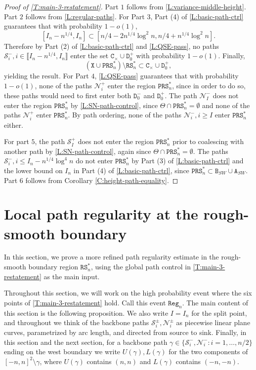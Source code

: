 \documentclass[11pt,twoside]{amsart}
\theoremstyle{plain}
\numberwithin{quest}{section}
\theoremstyle{remark}
\numberwithin{rem}{section}
\theoremstyle{definition}
\newcommand{\cS}{\mathcal{S}}
\newcommand{\cN}{\mathcal{N}}
\newcommand{\II}[1]{\llbracket #1 \rrbracket}
\renewcommand{\tt}[1]{{\mathtt{#1}}}
\begin{document}
	\begin{proof}[Proof of \cref{T:main-3-restatement}]
	Part $1$ follows from \cref{L:variance-middle-height}.	Part $2$ follows from \cref{L:regular-paths}. For Part $3$, Part (4) of \cref{L:basic-path-ctrl} guarantees that with probability $1 - o(1)$,
	 $$
	 [I_n - n^{1/4}, I_n] \subset [n/4 - 2 n^{1/4} \log^2 n, n/4 + n^{1/4} \log^2 n].
	 $$ 
	 Therefore by Part (2) of \cref{L:basic-path-ctrl} and \cref{L:QSE-pass}, no paths $\cS_i^-, i \in \II{I_n - n^{1/4}, I_n}$ enter the set $\tt{C}_\times \cup \tt{D}_0^+$ with probability $1 - o(1)$. Finally,
	 $$
	 (\tt{X} \cup \tt{PRS}^*_n) \setminus \tt{RS}^*_n \subset \tt{C}_\times \cup \tt{D}_0^+,
	 $$ 
	yielding the result. For Part $4$, \cref{L:QSE-pass} guarantees that with probability $1 - o(1)$, none of the paths $\cN_i^+$ enter the region $\tt{PRS}^*_n$, since in order to do so, these paths would need to first enter both $\tt{D}_0^-$ and $\tt{D}_0^+$. The path $\cN_I^-$ does not enter the region $\tt{PRS}^*_n$ by \cref{L:SN-path-control}, since $\Theta \cap \tt{PRS}^*_n = \emptyset$ and none of the paths $\cN_i^+$ enter $\tt{PRS}^*_n$. By path ordering, none of the paths $\cN_i^-, i \ge I$ enter $\tt{PRS}^*_n$ either.
	
	For part $5$, the path $\cS_I^+$ does not enter the region $\tt{PRS}^*_n$ prior to coalescing with another path by \cref{L:SN-path-control}, again since $\Theta \cap \tt{PRS}^*_n = \emptyset$.  The paths $\cS_i^-, i \le I_n - n^{1/4} \log^4 n$ do not enter $\tt{PRS}^*_n$ by Part (3) of \cref{L:basic-path-ctrl} and the lower bound on $I_n$ in Part (4) of \cref{L:basic-path-ctrl}, since $\tt{PRS}^*_n \subset \tt{B}_{SW} \cup \tt{A}_{SW}$. Part $6$ follows from Corollary \ref{C:height-path-equality}.
	\end{proof}
	
	\section{Local path regularity at the rough-smooth boundary}
	\label{S:regularity}
	In this section, we prove a more refined path regularity estimate in the rough-smooth boundary region $\tt{RS}_n^*$,  using the global path control in \cref{T:main-3-restatement} as the main input. 
	
	Throughout this section, we will work on the high probability event where the six points of \cref{T:main-3-restatement} hold. Call this event $\tt{Reg}_n$. The main content of this section is the following proposition. We also write $I = I_n$ for the split point, and throughout we think of the backbone paths $\cS_i^\pm, \cN_i^\pm$ as piecewise linear plane curves, parametrized by arc length, and directed from source to sink. Finally, in this section and the next section, for a backbone path $\gamma \in \{\cS_i^-, \cN_i^- : i = 1, \dots, n/2\}$ ending on the west boundary we write $U(\gamma), L(\gamma)$ for the two components of $[-n, n]^2 \setminus \gamma$, where $U(\gamma)$ contains $(n, n)$ and $L(\gamma)$ contains $(-n, -n)$.
	
\end{document}
